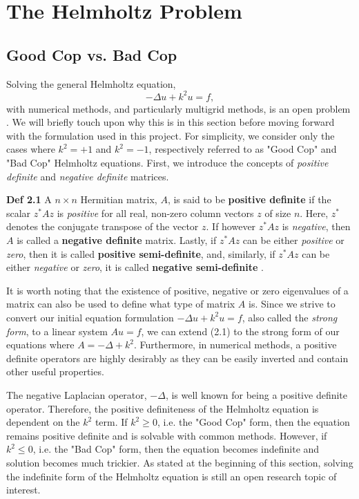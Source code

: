 \chapter{The Helmholtz Problem}

\section{Good Cop vs. Bad Cop}

Solving the general Helmholtz equation,
\begin{equation}
-\Delta u + k^2 u = f,
\end{equation}
with numerical methods, and particularly multigrid methods, is an open problem \cite{Ernst2012}.  We will briefly touch upon why this is in this section before moving forward with the formulation used in this project.  For simplicity, we consider only the cases where $k^2=+1$ and $k^2=-1$, respectively referred to as "Good Cop" and "Bad Cop" Helmholtz equations.  First, we introduce the concepts of \textit{positive definite} and \textit{negative definite} matrices.


\textbf{Def 2.1} A $n \times n$ Hermitian matrix, $A$, is said to be \textbf{positive definite} if the scalar $z^* A z$ is \textit{positive} for all real, non-zero column vectors $z$ of size $n$.  Here, $z^*$ denotes the conjugate transpose of the vector $z$.  If however $z^* A z$ is \textit{negative}, then $A$ is called a \textbf{negative definite} matrix.  Lastly, if $z^* A z$ can be either \textit{positive} or \textit{zero}, then it is called \textbf{positive semi-definite}, and, similarly, if $z^* A z$ can be either \textit{negative} or \textit{zero}, it is called \textbf{negative semi-definite} \cite{Keener2000}.


It is worth noting that the existence of positive, negative or zero eigenvalues of a matrix can also be used to define what type of matrix $A$ is.  Since we strive to convert our initial equation formulation $-\Delta u + k^2 u = f$, also called the \textit{strong form}, to a linear system $Au=f$, we can extend (2.1) to the strong form of our equations where $A=-\Delta + k^2$.  Furthermore, in numerical methods, a positive definite operators are highly desirably as they can be easily inverted and contain other useful properties.

The negative Laplacian operator, $-\Delta$, is well known for being a positive definite operator.  Therefore, the positive definiteness of the Helmholtz equation is dependent on the $k^2$ term.  If $k^2 \geq 0$, i.e. the "Good Cop" form, then the equation remains positive definite and is solvable with common methods.  However, if $k^2 \leq 0$, i.e. the "Bad Cop" form, then the equation becomes indefinite and solution becomes much trickier.  As stated at the beginning of this section, solving the indefinite form of the Helmholtz equation is still an open research topic of interest.

